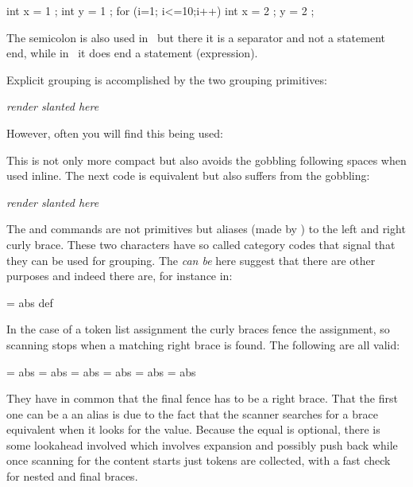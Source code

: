 \starttyping
int x = 1 ;
int y = 1 ;
for (i=1; i<=10;i++) {
    int x = 2 ;
    y = 2 ;
}
\stoptyping

The semicolon is also used in \PASCAL\ but there it is a separator and not a
statement end, while in \METAPOST\ it does end a statement (expression).

\stopsectionlevel

\stopsectionlevel

\startsectionlevel[title=Kinds of grouping]

Explicit grouping is accomplished by the two grouping primitives:

\starttyping[option=TEX]
\begingroup
    \sl render slanted here
\endgroup
\stoptyping

However, often you will find this being used:

\stoptyping

This is not only more compact but also avoids the \type {\endgroup} gobbling
following spaces when used inline. The next code is equivalent but also suffers
from the gobbling:

\starttyping[option=TEX]
\bgroup
    \sl render slanted here
\egroup
\stoptyping

The \type {\bgroup} and \type {\egroup} commands are not primitives but aliases
(made by \type {\let}) to the left and right curly brace. These two characters
have so called category codes that signal that they can be used for grouping. The
{\em can be} here suggest that there are other purposes and indeed there are, for
instance in:

\starttyping[option=TEX]
 = {abs}
\hbox {def}
\stoptyping

In the case of a token list assignment the curly braces fence the assignment, so scanning
stops when a matching right brace is found. The following are all valid:

\starttyping[option=TEX]
 = {a{b}s}
 = \bgroup a{b}s}
 = {a{\bgroup b}s}
 = {a{\egroup b}s}
 = \bgroup a{\bgroup b}s}
 = \bgroup a{\egroup b}s}
\stoptyping

They have in common that the final fence has to be a right brace. That the first
one can be a an alias is due to the fact that the scanner searches for a brace
equivalent when it looks for the value. Because the equal is optional, there is
some lookahead involved which involves expansion and possibly push back while
once scanning for the content starts just tokens are collected, with a fast
check for nested and final braces.

